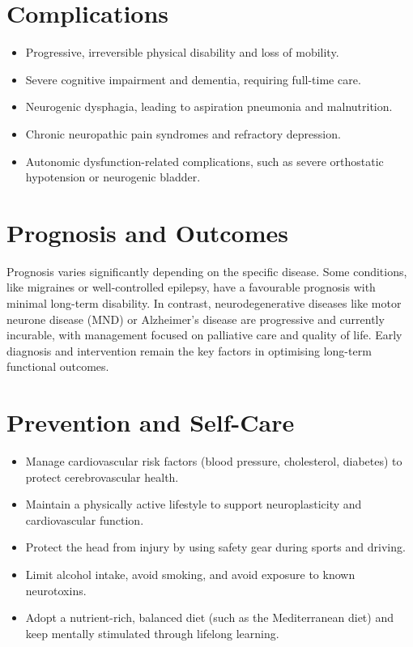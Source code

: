 \section*{Complications}
\begin{itemize}
    \item Progressive, irreversible physical disability and loss of mobility.
    \item Severe cognitive impairment and dementia, requiring full-time care.
    \item Neurogenic dysphagia, leading to aspiration pneumonia and malnutrition.
    \item Chronic neuropathic pain syndromes and refractory depression.
    \item Autonomic dysfunction-related complications, such as severe orthostatic hypotension or neurogenic bladder.
\end{itemize}

\section*{Prognosis and Outcomes}
Prognosis varies significantly depending on the specific disease. Some conditions, like migraines or well-controlled epilepsy, have a favourable prognosis with minimal long-term disability. In contrast, neurodegenerative diseases like motor neurone disease (MND) or Alzheimer's disease are progressive and currently incurable, with management focused on palliative care and quality of life. Early diagnosis and intervention remain the key factors in optimising long-term functional outcomes.

\section*{Prevention and Self-Care}
\begin{itemize}
    \item Manage cardiovascular risk factors (blood pressure, cholesterol, diabetes) to protect cerebrovascular health.
    \item Maintain a physically active lifestyle to support neuroplasticity and cardiovascular function.
    \item Protect the head from injury by using safety gear during sports and driving.
    \item Limit alcohol intake, avoid smoking, and avoid exposure to known neurotoxins.
    \item Adopt a nutrient-rich, balanced diet (such as the Mediterranean diet) and keep mentally stimulated through lifelong learning.
\end{itemize}

